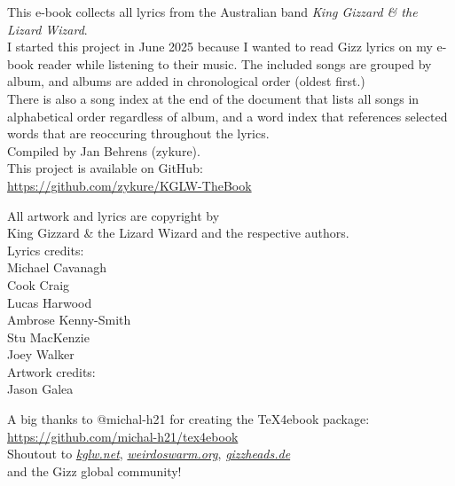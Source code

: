 \begin{center}
\vspace*{\fill}

This e-book collects all lyrics from the Australian band \emph{King Gizzard \& the Lizard Wizard}. \\
I started this project in June 2025 because I wanted to read Gizz lyrics on my e-book reader while listening to their music.
The included songs are grouped by album, and albums are added in chronological order (oldest first.) \\
There is also a song index at the end of the document that lists all songs in alphabetical order regardless of album,
and a word index that references selected words that are reoccuring throughout the lyrics. \\[5mm]

Compiled by Jan Behrens (zykure). \\[5mm]

This project is available on GitHub: \\
\href{https://github.com/zykure/KGLW-TheBook}{https://github.com/zykure/KGLW-TheBook} \\[10mm]

\epubnewpage

All artwork and lyrics are copyright by \\
King Gizzard \& the Lizard Wizard and the respective authors. \\[10mm]

Lyrics credits: \\
Michael Cavanagh \\
Cook Craig \\
Lucas Harwood \\
Ambrose Kenny-Smith \\
Stu MacKenzie \\
Joey Walker \\[10mm]

Artwork credits: \\
Jason Galea \\[10mm]

\epubnewpage

A big thanks to @michal-h21 for creating the TeX4ebook package: \\
\href{https://github.com/michal-h21/tex4ebook}{https://github.com/michal-h21/tex4ebook}  \\[5mm]

Shoutout to \href{https://kglw.net}{\textit{kglw.net}}, \href{https://weirdoswarm.org}{\textit{weirdoswarm.org}}, \href{https://gizzheads.de}{\textit{gizzheads.de}} \\
and the Gizz global community!  \\

\vfill
\end{center}
